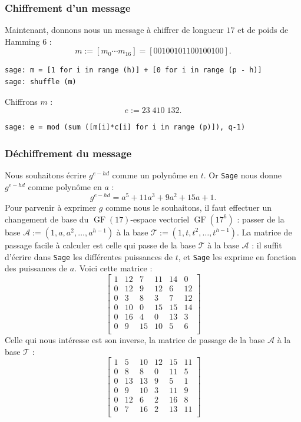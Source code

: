 \documentclass[a4paper, titlepage]{article}
\theoremstyle{definition}
\theoremstyle{remark}
\def\gf{\operatorname{GF}}
\begin{document}
\subsubsection*{Chiffrement d'un message}
Maintenant, donnons nous un message à chiffrer de longueur $17$ et de poids de Hamming $6$ :
$$m := [m_0\cdots m_{16}] = [00100101100100100].$$
\begin{verbatim}
sage: m = [1 for i in range (h)] + [0 for i in range (p - h)]
sage: shuffle (m)
\end{verbatim}
Chiffrons $m$ :
$$e := 23\;410\;132.$$
\begin{verbatim}
sage: e = mod (sum ([m[i]*c[i] for i in range (p)]), q-1)
\end{verbatim}

\subsubsection*{Déchiffrement du message}
Nous souhaitons écrire $g^{e - hd}$ comme un polynôme en $t$. Or \verb|Sage| nous donne $g^{e - hd}$ comme polynôme en $a$ : $$g^{e - hd} = a^5 + 11a^3 + 9a^2 + 15a + 1.$$
Pour parvenir à exprimer $g$ comme nous le souhaitons, il faut effectuer un changement de base du $\gf(17)$-espace vectoriel $\gf(17^6)$ : passer de la base $\mathcal{A} := (1, a, a^2, \dots, a^{h-1})$ à la base $\mathcal{T} := (1, t, t^2, \dots, t^{h-1})$.
La matrice de passage facile à calculer est celle qui passe de la base $\mathcal{T}$ à la base $\mathcal{A}$ : il suffit d'écrire dans \verb|Sage| les différentes puissances de $t$, et \verb|Sage| les exprime en fonction des puissances de $a$. Voici cette matrice :
$$\left[\begin{array}{cccccc}
1 & 12 & 7 & 11 & 14 & 0 \\
0 & 12 & 9 & 12 & 6 & 12 \\
0 & 3 & 8 & 3 & 7 & 12 \\
0 & 10 & 0 & 15 & 15 & 14 \\
0 & 16 & 4 & 0 & 13 & 3 \\
0 & 9 & 15 & 10 & 5 & 6 \\
\end{array}\right]$$
Celle qui nous intéresse est son inverse, la matrice de passage de la base $\mathcal{A}$ à la base $\mathcal{T}$ :
$$\left[\begin{array}{cccccc}
1 & 5 & 10 & 12 & 15 & 11 \\
0 & 8 & 8 & 0 & 11 & 5 \\
0 & 13 & 13 & 9 & 5 & 1 \\
0 & 9 & 10 & 3 & 11 & 9 \\
0 & 12 & 6 & 2 & 16 & 8 \\
0 & 7 & 16 & 2 & 13 & 11 \\
\end{array}\right]$$
\end{document}
